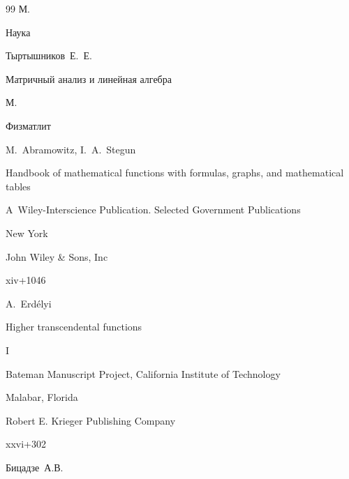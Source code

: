 \begin{thebibliography}{99}
\publaddr М.

\publ Наука







\by Тыртышников~Е.~Е.

\book Матричный анализ и линейная алгебра

\publaddr М.

\publ Физматлит









\eds M.~Abramowitz, I.~A.~Stegun

\book Handbook of mathematical functions with formulas, graphs, and mathematical tables

\serial A~Wiley-Interscience Publication. Selected Government Publications

\publaddr New York

\publ John Wiley \& Sons, Inc

\totalpages xiv+1046 











\ed A.~Erd\'elyi

\book Higher transcendental functions

\bookvol I

\serial Bateman Manuscript Project, California Institute of Technology

\publaddr Malabar, Florida

\publ Robert E. Krieger Publishing Company

\totalpages xxvi+302 








\by Бицадзе~А.В.


\end{thebibliography}
